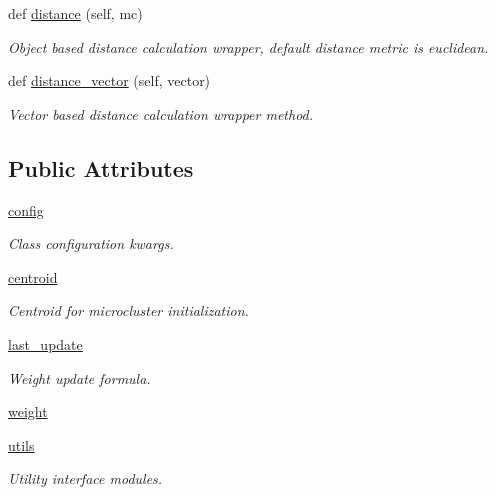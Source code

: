 \begin{DoxyCompactItemize}
def \hyperlink{classStreamClusteringAlgorithms_1_1evoStream_1_1v1_1_1Classes_1_1MicroClusterV1_1_1MicroClusterV1_ab8516e0a725a95e796becd032401ddc1}{distance} (self, mc)
\begin{DoxyCompactList}\small\item\em Object based distance calculation wrapper, default distance metric is euclidean. \end{DoxyCompactList}\item 
def \hyperlink{classStreamClusteringAlgorithms_1_1evoStream_1_1v1_1_1Classes_1_1MicroClusterV1_1_1MicroClusterV1_aa08f1e1397fba3cf685ab6c57bd618ed}{distance\+\_\+vector} (self, vector)
\begin{DoxyCompactList}\small\item\em Vector based distance calculation wrapper method. \end{DoxyCompactList}\end{DoxyCompactItemize}
\subsection*{Public Attributes}
\begin{DoxyCompactItemize}
\item 
\hyperlink{classStreamClusteringAlgorithms_1_1evoStream_1_1v1_1_1Classes_1_1MicroClusterV1_1_1MicroClusterV1_a1e4653433268a1780f6702c33731645b}{config}
\begin{DoxyCompactList}\small\item\em Class configuration kwargs. \end{DoxyCompactList}\item 
\hyperlink{classStreamClusteringAlgorithms_1_1evoStream_1_1v1_1_1Classes_1_1MicroClusterV1_1_1MicroClusterV1_a1564bd2f57e01b78ba6f32145e2394b3}{centroid}
\begin{DoxyCompactList}\small\item\em Centroid for microcluster initialization. \end{DoxyCompactList}\item 
\hyperlink{classStreamClusteringAlgorithms_1_1evoStream_1_1v1_1_1Classes_1_1MicroClusterV1_1_1MicroClusterV1_a57fcddb96fd19b15fbdb1e6c21d5894c}{last\+\_\+update}
\begin{DoxyCompactList}\small\item\em Weight update formula. \end{DoxyCompactList}\item 
\hyperlink{classStreamClusteringAlgorithms_1_1evoStream_1_1v1_1_1Classes_1_1MicroClusterV1_1_1MicroClusterV1_a41ebafc3c8dd9afa188c2068ceb045ac}{weight}
\item 
\hyperlink{classStreamClusteringAlgorithms_1_1evoStream_1_1v1_1_1Classes_1_1MicroClusterV1_1_1MicroClusterV1_ac09b27bb33c4b34f8006bdf9db081416}{utils}
\begin{DoxyCompactList}\small\item\em Utility interface modules. \end{DoxyCompactList}\end{DoxyCompactItemize}


